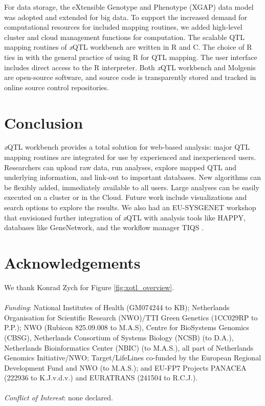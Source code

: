 For data storage, the eXtensible Genotype and Phenotype (XGAP) data model was adopted \cite{Swertz_2010b} and extended for big data. To support the increased demand for computational resources for included mapping routines, we added high-level cluster and cloud management functions for computation. The scalable QTL mapping routines of \textsl{x}QTL workbench are written in R and C. The choice of R ties in with the general practice of using R for QTL mapping. The user interface includes direct access to the R interpreter. Both \textsl{x}QTL workbench and Molgenis are open-source software, and source code is transparently stored and tracked in online source control repositories.

\section{Conclusion}
\textsl{x}QTL workbench provides a total solution for web-based analysis: major QTL mapping routines are integrated for use by experienced and inexperienced users.
Researchers can upload raw data, run analyses, explore mapped QTL and underlying information, and link-out to important databases.
New algorithms can be flexibly added, immediately available to all users. Large analyses can be easily executed on a cluster or in the Cloud.
Future work include visualizations and search options to explore the results.
We also had an EU-SYSGENET workshop that envisioned further integration of \textsl{x}QTL with analysis tools like HAPPY, databases like GeneNetwork, and the workflow manager TIQS \cite{Durrant_2011}.

\section*{Acknowledgements}
We thank Konrad Zych for Figure \ref{fig:xqtl_overview}.
\\~\\
\textsl{Funding}: National Institutes of Health (GM074244 to KB); Netherlands Organisation for Scientific Research (NWO)/TTI Green Genetics (1CC029RP to P.P.); NWO (Rubicon 825.09.008 to M.A.S), Centre for BioSystems Genomics (CBSG), Netherlands Consortium of Systems Biology (NCSB) (to D.A.), Netherlands Bioinformatics Center (NBIC) (to M.A.S.), all part of Netherlands Genomics Initiative/NWO; Target/LifeLines co-funded by the European Regional Development Fund and NWO (to M.A.S.); and EU-FP7 Projects PANACEA (222936 to K.J.v.d.v.) and EURATRANS (241504 to R.C.J.).
\\~\\
\textsl{Conflict of Interest}: none declared.




